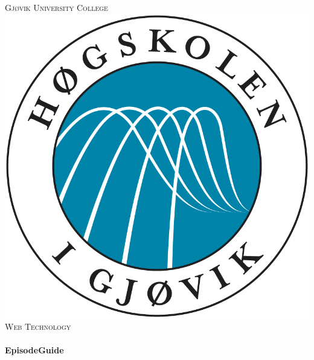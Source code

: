 \begin{titlepage}

\center %
 

\textsc{\LARGE Gjøvik University College}\\[0.7cm] %

\includegraphics[scale=0.15]{Logo}\\[0.7cm]%

\textsc{\Large Web Technology}\\[0.5cm] %


\HRule \\[0.4cm]
{ \huge \bfseries EpisodeGuide}\\[0.2cm] %
\HRule \\[1cm]
 

\end{titlepage}

